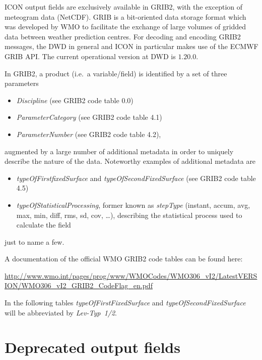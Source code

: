 
ICON output fields are exclusively available in \gls{GRIB2}, with the exception of 
meteogram data (NetCDF). GRIB is a bit-oriented data storage format which was developed by \gls{WMO} to facilitate the exchange of large volumes of 
gridded data between weather prediction centres. For decoding and encoding GRIB2 messages, the DWD in general and ICON in particular 
makes use of the ECMWF GRIB API. The current operational version at DWD is $1.20.0$.
 
In GRIB2, a product (i.e.\ a variable/field) is identified by a set of three parameters
\begin{itemize}
 \item \emph{Discipline} (see GRIB2 code table 0.0)
 \item \emph{ParameterCategory} (see GRIB2 code table 4.1)
 \item \emph{ParameterNumber} (see GRIB2 code table 4.2), 
\end{itemize}
augmented by a large number of additional metadata in order to uniquely describe the nature of the data. Noteworthy examples 
of additional metadata are 
\begin{itemize}
  \item \emph{typeOfFirstfixedSurface} and \emph{typeOfSecondFixedSurface} (see GRIB2 code table 4.5)
  \item \emph{typeOfStatisticalProcessing}, former known as \emph{stepType} (instant, accum, avg, max, min, diff, rms, sd, cov, \dots),
        describing the statistical process used to calculate the field
 \end{itemize}
just to name a few.

A documentation of the official WMO GRIB2 code tables can be found here: 

\begin{minipage}{\textwidth}
\url{http://www.wmo.int/pages/prog/www/WMOCodes/WMO306_vI2/LatestVERSION/WMO306_vI2_GRIB2_CodeFlag_en.pdf}
\end{minipage}

In the following tables \emph{typeOfFirstFixedSurface} and \emph{typeOfSecondFixedSurface} will be abbreviated by \emph{Lev-Typ~1/2}.



\section{Deprecated output fields}

